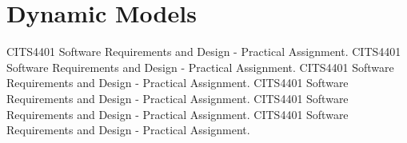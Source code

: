 \section{Dynamic Models}

\par
CITS4401 Software Requirements and Design - Practical Assignment.
CITS4401 Software Requirements and Design - Practical Assignment.
CITS4401 Software Requirements and Design - Practical Assignment.
CITS4401 Software Requirements and Design - Practical Assignment.
CITS4401 Software Requirements and Design - Practical Assignment.
CITS4401 Software Requirements and Design - Practical Assignment.